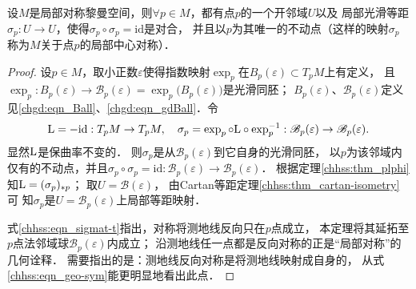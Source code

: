 \begin{theorem}\label{chhss:thm_lsg}
    设$M$是局部对称黎曼空间，则$\forall p \in M$，都有点$p$的一个开邻域$U$以及
    局部光滑等距$\sigma_p: U \rightarrow U$，使得$\sigma_p \circ \sigma_p=\mathrm{id}$是对合，
    并且以$p$为其唯一的不动点（这样的映射$\sigma_p$称为$M$关于点$p$的{\heiti 局部中心对称}）．
\end{theorem}
\begin{proof}
    设$p \in M$，取小正数$\varepsilon$使得指数映射$\exp_p$在$B_p(\varepsilon)\subset T_p M$上有定义，
    且$\exp_p: B_p(\varepsilon) \to \mathscr{B}_p(\varepsilon)=\exp_p\bigl(B_p(\varepsilon)\bigr)$是光滑同胚；
    $B_p(\varepsilon)$、$\mathscr{B}_p(\varepsilon)$定义见\eqref{chgd:eqn_Ball}、\eqref{chgd:eqn_gdBall}．令
    \begin{equation}
        {\rm L}=-\mathrm{id}: T_p M \to T_p M, \quad 
        \sigma_p=\exp _p \circ {\rm L} \circ \exp _p^{-1}:
        \mathscr{B}_p(\varepsilon) \to \mathscr{B}_p(\varepsilon) .
    \end{equation}
    显然${\rm L}$是保曲率不变的．
    则$\sigma_p$是从$\mathscr{B}_p(\varepsilon)$到它自身的光滑同胚，
    以$p$为该邻域内仅有的不动点，并且$\sigma_p \circ \sigma_p=\mathrm{id}:
    \mathscr{B}_p(\varepsilon) \rightarrow \mathscr{B}_p(\varepsilon)$．
    根据定理\ref{chhss:thm_plphi}知${\rm L}= (\sigma_p)_{*p}$；
    取$U=\mathscr{B}(\varepsilon)$，
    由Cartan等距定理\ref{chhss:thm_cartan-isometry}可
    知$\sigma_p$是$U=\mathscr{B}_p(\varepsilon)$上局部等距映射．
    
    {\kaishu 
    式\eqref{chhss:eqn_sigmat-t}指出，对称将测地线反向只在$p$点成立，
    本定理将其延拓至$p$点法邻域球$\mathscr{B}_p(\varepsilon)$内成立；
    沿测地线任一点都是反向对称的正是“局部对称”的几何诠释．
    需要指出的是：测地线反向对称是将测地线映射成自身的，
    从式\eqref{chhss:eqn_geo-sym}能更明显地看出此点．}
\end{proof}



